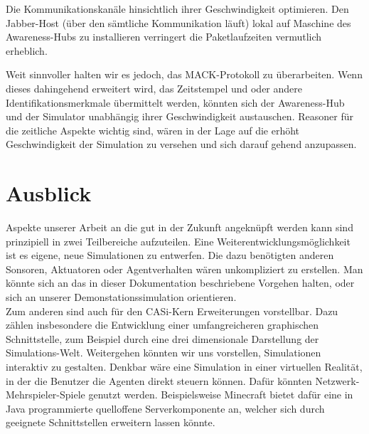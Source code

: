 Die Kommunikationskanäle hinsichtlich ihrer Geschwindigkeit optimieren. Den Jabber-Host (über den sämtliche Kommunikation läuft) lokal auf Maschine des Awareness-Hubs zu installieren verringert die Paketlaufzeiten vermutlich erheblich.

Weit sinnvoller halten wir es jedoch, das MACK-Protokoll zu überarbeiten. Wenn dieses dahingehend erweitert wird, das Zeitstempel und oder andere Identifikationsmerkmale übermittelt werden, könnten sich der Awareness-Hub und der Simulator unabhängig ihrer Geschwindigkeit austauschen. Reasoner für die zeitliche Aspekte wichtig sind, wären in der Lage auf die erhöht Geschwindigkeit der Simulation zu versehen und sich darauf gehend anzupassen.

\section{Ausblick}\label{sec:conc_outlook}
Aspekte unserer Arbeit an die gut in der Zukunft angeknüpft werden kann sind prinzipiell in zwei Teilbereiche aufzuteilen. Eine Weiterentwicklungsmöglichkeit ist es eigene, neue Simulationen zu entwerfen. Die dazu benötigten anderen Sonsoren, Aktuatoren oder Agentverhalten wären unkompliziert zu erstellen. Man könnte sich an das in dieser Dokumentation beschriebene Vorgehen halten, oder sich an unserer Demonstations\-simulation orientieren.\\

Zum anderen sind auch für den CASi-Kern Erweiterungen vorstellbar. Dazu zählen insbesondere die Entwicklung einer umfangreicheren graphischen Schnittstelle, zum Beispiel durch eine drei dimensionale Darstellung der Simulations-Welt. Weitergehen könnten wir uns vorstellen, Simulationen interaktiv zu gestalten. Denkbar wäre  eine Simulation in einer virtuellen Realität, in der die Benutzer die Agenten direkt steuern können. Dafür könnten Netzwerk-Mehrspieler-Spiele genutzt werden. Beispielsweise Minecraft \cite{web-minecraft} bietet dafür eine in Java programmierte quelloffene Serverkomponente an, welcher sich durch geeignete Schnittstellen erweitern lassen könnte.
